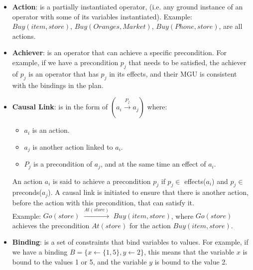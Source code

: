 \begin{itemize}
    \item \label{def:action}
          \textbf{Action}:  is a partially instantiated operator,
          (i.e. any ground instance of an operator with some of its variables instantiated).
          Example: $Buy(item,store)$, $Buy(Oranges,Market)$, $Buy(Phone,store)$, are all actions.

    \item \label{def:achiever}
          \textbf{Achiever}: is an operator that can achieve a specific precondition. For example, if we have a precondition $p_j$ that needs to be satisfied, the achiever of $p_j$ is an operator that has $p_j$ in its effects, and their \ac{MGU} is consistent with the bindings in the plan.

    \item \label{def:causal_link}
          \textbf{Causal Link}: is in the form of $(a_i \xrightarrow{\text{$P_j$}} a_j)$ where:
          \begin{itemize}
              \item $a_i$ is an action.
              \item $a_j$ is another action linked to $a_i$.
              \item $P_j$ is a precondition of $a_j$, and at the same time an effect of $a_i$.
          \end{itemize}
          An action $a_i$ is said to achieve a precondition $p_j$ if $p_j \in$ effects($a_i$) and $p_j \in$ preconds($a_j$).
          A causal link is initiated to ensure that there is another action, before the action with this precondition, that can satisfy it.
          \\ Example: $Go(store)$ $\xrightarrow{\text{$At(store)$}}$ $Buy(item,store)$, where $Go(store)$ achieves the precondition $At(store)$ for the action $Buy(item,store)$.

    \item \label{def:binding_constraint}
          \textbf{Binding}: is a set of constraints that bind variables to values.
          For example, if we have a binding $B = \{x \leftarrow \{1,5\}, y \leftarrow 2\}$, this means that the variable $x$ is bound to the values 1 or 5,
          and the variable $y$ is bound to the value 2.


\end{itemize}
